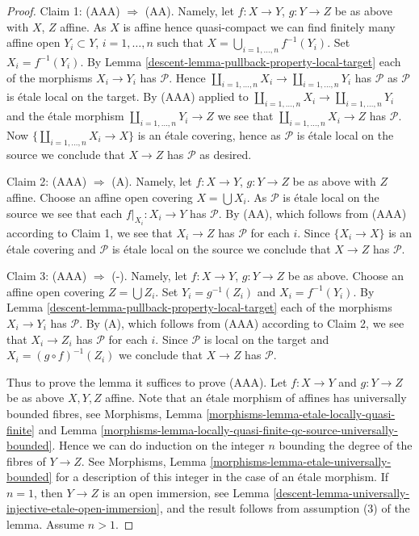 \begin{proof}
\medskip\noindent
Claim 1: (AAA) $\Rightarrow$ (AA).
Namely, let $f : X \to Y$, $g : Y \to Z$ be as above with $X$, $Z$ affine.
As $X$ is affine hence quasi-compact we can find finitely many
affine open $Y_i \subset Y$, $i = 1, \ldots, n$ such that
$X = \bigcup_{i = 1, \ldots, n} f^{-1}(Y_i)$. Set $X_i = f^{-1}(Y_i)$. By
Lemma \ref{descent-lemma-pullback-property-local-target}
each of the morphisms $X_i \to Y_i$ has $\mathcal{P}$.
Hence $\coprod_{i = 1, \ldots, n} X_i \to \coprod_{i = 1, \ldots, n} Y_i$
has $\mathcal{P}$ as $\mathcal{P}$ is \'etale local on the target.
By (AAA) applied to
$\coprod_{i = 1, \ldots, n} X_i \to \coprod_{i = 1, \ldots, n} Y_i$
and the \'etale morphism $\coprod_{i = 1, \ldots, n} Y_i \to Z$
we see that $\coprod_{i = 1, \ldots, n} X_i \to Z$ has $\mathcal{P}$.
Now $\{\coprod_{i = 1, \ldots, n} X_i \to X\}$ is an \'etale
covering, hence as $\mathcal{P}$ is \'etale local on the source
we conclude that $X \to Z$ has $\mathcal{P}$ as desired.

\medskip\noindent
Claim 2: (AAA) $\Rightarrow$ (A).
Namely, let $f : X \to Y$, $g : Y \to Z$ be as above with $Z$ affine.
Choose an affine open covering $X = \bigcup X_i$.
As $\mathcal{P}$ is \'etale local on the source we see that
each $f|_{X_i} : X_i \to Y$ has $\mathcal{P}$.
By (AA), which follows from (AAA) according to Claim 1, we see that
$X_i \to Z$ has $\mathcal{P}$ for each $i$.
Since $\{X_i \to X\}$ is an \'etale covering and $\mathcal{P}$ is \'etale
local on the source we conclude that
$X \to Z$ has $\mathcal{P}$.

\medskip\noindent
Claim 3: (AAA) $\Rightarrow$ (-).
Namely, let $f : X \to Y$, $g : Y \to Z$ be as above.
Choose an affine open covering $Z = \bigcup Z_i$.
Set $Y_i = g^{-1}(Z_i)$ and $X_i = f^{-1}(Y_i)$. By
Lemma \ref{descent-lemma-pullback-property-local-target}
each of the morphisms $X_i \to Y_i$ has $\mathcal{P}$.
By (A), which follows from (AAA) according to Claim 2, we see that
$X_i \to Z_i$ has $\mathcal{P}$ for each $i$.
Since $\mathcal{P}$ is local on the target and $X_i = (g \circ f)^{-1}(Z_i)$
we conclude that $X \to Z$ has $\mathcal{P}$.

\medskip\noindent
Thus to prove the lemma it suffices to prove (AAA).
Let $f : X \to Y$ and $g : Y \to Z$ be as above $X, Y, Z$ affine.
Note that an \'etale morphism of affines has universally bounded fibres, see
Morphisms,
Lemma \ref{morphisms-lemma-etale-locally-quasi-finite} and
Lemma \ref{morphisms-lemma-locally-quasi-finite-qc-source-universally-bounded}.
Hence we can do induction on the integer $n$ bounding the degree of the fibres
of $Y \to Z$. See
Morphisms, Lemma \ref{morphisms-lemma-etale-universally-bounded}
for a description of this integer in the case of an \'etale morphism.
If $n = 1$, then $Y \to Z$ is an open immersion, see
Lemma \ref{descent-lemma-universally-injective-etale-open-immersion},
and the result follows from assumption (3) of the lemma. Assume $n > 1$.


\end{proof}
